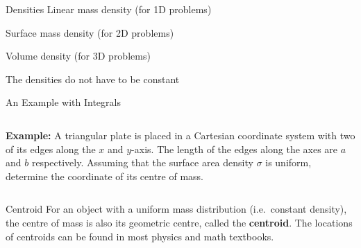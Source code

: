\documentclass[12pt,compress,aspectratio=169]{beamer}
\begin{document}
\begin{frame}{Densities}
  Linear mass density (for 1D problems)


  Surface mass density (for 2D problems)


  Volume density (for 3D problems)

  
  The densities do not have to be constant
\end{frame}



\begin{frame}{An Example with Integrals}
  \begin{columns}
    \textbf{Example:} A triangular plate is placed in a Cartesian coordinate
    system with two of its edges along the $x$ and $y$-axis. The length of the
    edges along the axes are $a$ and $b$ respectively. Assuming that the
    surface area density $\sigma$ is uniform, determine the coordinate of its
    centre of mass.

  \end{columns}
\end{frame}



\begin{frame}{Centroid}
  For an object with a uniform mass distribution (i.e.\ constant density), the
  centre of mass is also its geometric centre, called the \textbf{centroid}.
  The locations of centroids can be found in most physics and math textbooks.
  \begin{center}
  \end{center}
\end{frame}
\end{document}

